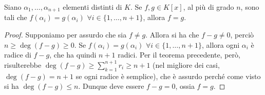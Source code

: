 \begin{corollario} \label{c:principio-identita-polinomi}
	Siano $\alpha_1, \dots, \alpha_{n+1}$ elementi distinti di $K$.
	Se $f,g\in K[x]$, al più di grado $n$, sono tali che $f(\alpha_i)=g(\alpha_i)$ $\forall i\in\{1,\dots,n+1\}$, allora $f=g$.
\end{corollario}
\begin{proof}
	Supponiamo per assurdo che sia $f\ne g$.
	Allora si ha che $f-g\ne 0$, perciò $n\ge\deg (f-g)\ge 0$.
	Se $f(\alpha_i)=g(\alpha_i)$ $\forall i\in\{1,\dots,n+1\}$, allora ogni $\alpha_i$ è radice di $f-g$, che ha quindi $n+1$ radici.
	Per il teorema precedente, però, risulterebbe $\deg(f-g)\ge\sum_{k=1}^{n+1}r_i\ge n+1$ (nel migliore dei casi, $\deg(f-g)=n+1$ se ogni radice è semplice), che è assurdo perch\'e come visto si ha $\deg(f-g)\le n$.
	Dunque deve essere $f-g=0$, ossia $f=g$.
\end{proof}
